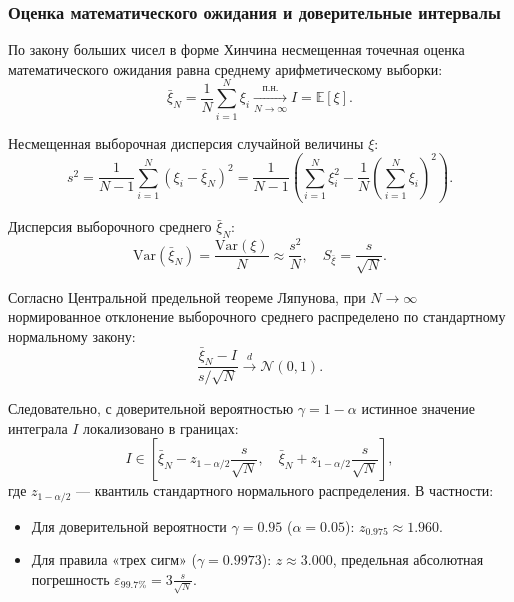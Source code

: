 \documentclass[11pt,a4paper]{article}
\begin{document}
\subsubsection{Оценка математического ожидания и доверительные интервалы}
По закону больших чисел в форме Хинчина несмещенная точечная оценка математического ожидания равна среднему арифметическому выборки:
\begin{equation}
    \bar{\xi}_N = \frac{1}{N} \sum_{i=1}^N \xi_i \xrightarrow[N \to \infty]{\text{п.н.}} I = \mathbb{E}[\xi].
\end{equation}

Несмещенная выборочная дисперсия случайной величины $\xi$:
\begin{equation}
    s^2 = \frac{1}{N - 1} \sum_{i=1}^N (\xi_i - \bar{\xi}_N)^2 = \frac{1}{N - 1} \left( \sum_{i=1}^N \xi_i^2 - \frac{1}{N} \left( \sum_{i=1}^N \xi_i \right)^2 \right).
    \label{eq:sample_var}
\end{equation}

Дисперсия выборочного среднего $\bar{\xi}_N$:
\begin{equation}
    \mathrm{Var}(\bar{\xi}_N) = \frac{\mathrm{Var}(\xi)}{N} \approx \frac{s^2}{N}, \quad S_{\bar{\xi}} = \frac{s}{\sqrt{N}}.
\end{equation}

Согласно Центральной предельной теореме Ляпунова, при $N \to \infty$ нормированное отклонение выборочного среднего распределено по стандартному нормальному закону:
\begin{equation}
    \frac{\bar{\xi}_N - I}{s / \sqrt{N}} \xrightarrow{d} \mathcal{N}(0, 1).
\end{equation}

Следовательно, с доверительной вероятностью $\gamma = 1 - \alpha$ истинное значение интеграла $I$ локализовано в границах:
\begin{equation}
    I \in \left[ \bar{\xi}_N - z_{1 - \alpha/2} \frac{s}{\sqrt{N}}, \quad \bar{\xi}_N + z_{1 - \alpha/2} \frac{s}{\sqrt{N}} \right],
\end{equation}
где $z_{1 - \alpha/2}$ --- квантиль стандартного нормального распределения. В частности:
\begin{itemize}
    \item Для доверительной вероятности $\gamma = 0.95$ ($\alpha = 0.05$): $z_{0.975} \approx 1.960$.
    \item Для правила «трех сигм» ($\gamma = 0.9973$): $z \approx 3.000$, предельная абсолютная погрешность $\varepsilon_{99.7\%} = 3 \frac{s}{\sqrt{N}}$.
\end{itemize}
\end{document}
